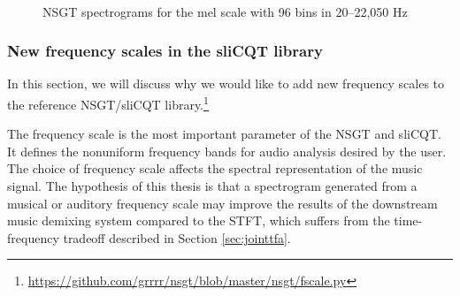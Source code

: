 \documentclass[report.tex]{subfiles}
\begin{document}
\begin{figure}[ht]
	\centering
	\\
	\caption{NSGT spectrograms for the mel scale with 96 bins in 20--22,050 Hz}
	\label{fig:overlappedspectrograms}
\end{figure}

\subsubsection{New frequency scales in the sliCQT library}
\label{sec:improvelib}

In this section, we will discuss why we would like to add new frequency scales to the reference NSGT/sliCQT library.\footnote{\url{https://github.com/grrrr/nsgt/blob/master/nsgt/fscale.py}}

The frequency scale is the most important parameter of the NSGT and sliCQT. It defines the nonuniform frequency bands for audio analysis desired by the user. The choice of frequency scale affects the spectral representation of the music signal. The hypothesis of this thesis is that a spectrogram generated from a musical or auditory frequency scale may improve the results of the downstream music demixing system compared to the STFT, which suffers from the time-frequency tradeoff described in Section \ref{sec:jointtfa}.
\end{document}
